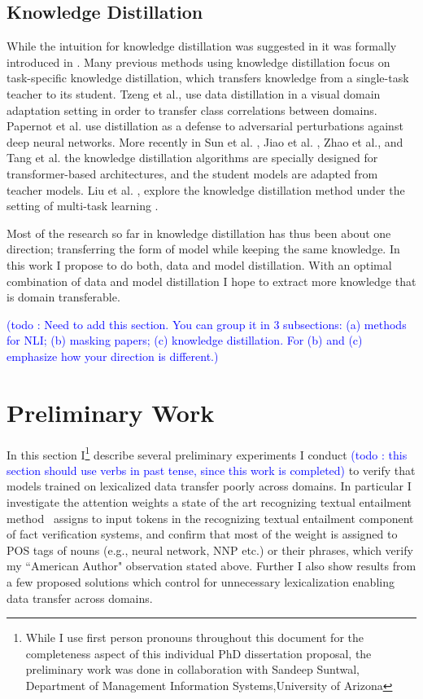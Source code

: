 \documentclass{article}
\newcommand\todo[1]{\textcolor{blue}{(todo : #1)}}
\begin{document}
\subsection{Knowledge Distillation}
While the intuition for knowledge distillation was suggested in \citep*{ba2014deep} it was formally introduced in \citep*{hinton2015distilling}. Many previous methods using knowledge distillation focus on task-specific knowledge distillation, which transfers knowledge from a single-task teacher to its student. Tzeng et al.\citep*{tzeng2015simultaneous}, use data distillation in a visual domain adaptation setting in order to transfer class correlations between domains. Papernot et al. \citep*{papernot2016distillation} use distillation as a defense to adversarial perturbations against deep neural networks. More recently in Sun et al. \citep*{sun2019patient} , Jiao et al. \citep*{jiao2019tinybert},  Zhao et al.\citep*{zhao2019extreme}, and Tang et al. \citep*{tang2019distilling} the knowledge distillation algorithms are specially designed for transformer-based architectures, and the student models are adapted from teacher models. Liu et al. \citep*{liu2019attentive}, explore the knowledge distillation method under the setting of multi-task learning \citep*{caruana1997multitask} \citep*{baxter2000model}.

Most of the research so far in knowledge distillation has thus been about one direction; transferring the form of model while keeping the same knowledge. In this work I propose to do both, data and model distillation. With an optimal combination of data and model distillation I hope to extract more knowledge that is domain transferable.


\todo{Need to add this section. You can group it in 3 subsections: (a) methods for NLI; (b) masking papers; (c) knowledge distillation. For (b) and (c) emphasize how your direction is different.}

\section{Preliminary Work}


In this section I\footnote{While I use first person pronouns throughout this document for the completeness aspect of this individual PhD dissertation proposal, the preliminary work was done in collaboration with Sandeep Suntwal,  Department of Management Information Systems,University of Arizona} describe several preliminary experiments I conduct \todo{this section should use verbs in past tense, since this work is completed} to verify that models trained on lexicalized data transfer poorly across domains. In particular I investigate the attention weights a state of the art recognizing textual entailment method~\citep*{parikh2016decomposable} assigns to input tokens in the recognizing textual entailment component of fact verification systems, and confirm that most of the weight is assigned to POS tags of nouns (e.g., neural network, NNP etc.) or their phrases, which verify my ``American Author" observation stated above. Further I also show results from a few proposed solutions which control for unnecessary lexicalization enabling data transfer across domains.
\end{document}
